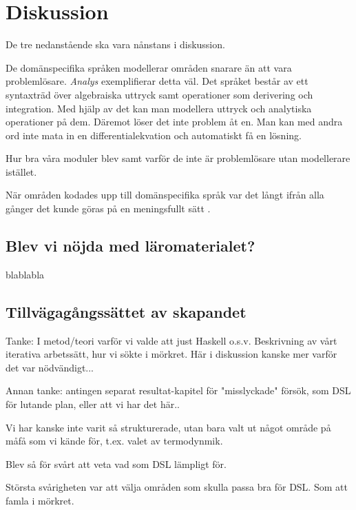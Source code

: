 
\chapter{Diskussion}

\begin{binge}
De tre nedanstående ska vara nånstans i diskussion.

De domänspecifika språken modellerar områden snarare än att vara problemlösare. \textit{Analys} exemplifierar detta väl. Det språket består av ett syntaxträd över algebraiska uttryck samt operationer som derivering och integration. Med hjälp av det kan man modellera uttryck och analytiska operationer på dem. Däremot löser det inte problem åt en. Man kan med andra ord inte mata in en differentialekvation och automatiskt få en lösning.

Hur bra våra moduler blev samt varför de inte är problemlösare utan modellerare istället.

När områden kodades upp till domänspecifika språk var det långt ifrån alla gånger
det kunde göras på en meningsfullt sätt .

\section{Blev vi nöjda med läromaterialet?}

blablabla

\section{Tillvägagångssättet av skapandet}

Tanke: I metod/teori varför vi valde att just Haskell o.s.v. Beskrivning av
vårt iterativa arbetssätt, hur vi sökte i mörkret. Här i diskussion kanske mer
varför det var nödvändigt...

Annan tanke: antingen separat resultat-kapitel för "misslyckade" försök, som
DSL för lutande plan, eller att vi har det här..

Vi har kanske inte varit så strukturerade, utan bara valt ut något område på
måfå som vi kände för, t.ex. valet av termodynmik.

Blev så för svårt att veta vad som DSL lämpligt för.

Största svårigheten var att välja områden som skulla passa bra för DSL. Som att
famla i mörkret.


\end{binge}
